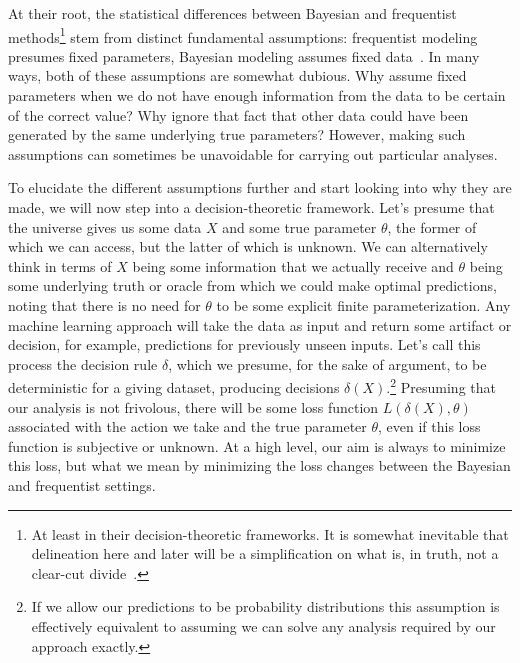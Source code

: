 At their root, the statistical differences between Bayesian and frequentist methods\footnote{At least in their decision-theoretic
frameworks.  It is somewhat inevitable that delineation here and later will be a simplification on what is, in truth, not a 
clear-cut divide~\citep{gelman2011induction}.}
stem from distinct fundamental
assumptions: frequentist modeling presumes fixed parameters, Bayesian modeling assumes fixed data~\citep{jordan2009you}.  In many ways,
both of these assumptions are somewhat dubious. Why assume fixed parameters when we do not have enough
information from the data to be certain of the correct value?  Why ignore that fact that other data could have 
been generated by the same underlying true parameters?  However,
making such assumptions can sometimes be unavoidable for carrying out particular analyses.

To elucidate the
different assumptions further and start looking into why they are made, we will now step into a decision-theoretic
framework.  Let's presume that the universe gives us some data $X$ and some true parameter $\theta$, the former of which
we can access, but the latter of which is unknown.  We can alternatively think in terms of $X$ being some information
that we actually receive and $\theta$ being some underlying truth or oracle from which we could make optimal predictions, noting 
that there is
no need for $\theta$ to be some explicit finite parameterization.  Any machine learning approach will take the data as input and
return some artifact or decision, for example, predictions for previously unseen inputs.  
Let's call this process the decision rule $\delta$, which we presume, for the sake of argument, to be 
deterministic for a giving dataset, producing decisions $\delta(X)$.\footnote{If we allow our predictions to be probability
distributions this assumption is effectively equivalent to assuming we can solve any analysis required by our approach exactly.}
Presuming that our analysis is not frivolous, there will be some loss function $L(\delta(X),\theta)$ associated with the action we take
and the true parameter $\theta$, even if this loss function is subjective or unknown.  At a high level, our aim is always to
minimize this loss, but what we mean by minimizing the loss changes between the Bayesian and frequentist settings.  

